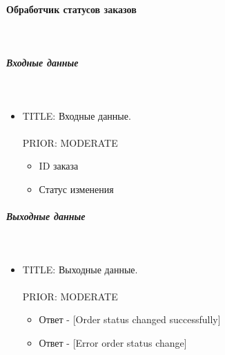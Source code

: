 \paragraph{Обработчик статусов заказов} \mbox{} \\ \label{service_order_status_processing}

	\subparagraph{Входные данные} \mbox{} \\ \label{}

      \begin{itemize}

        \item{

          TITLE: Входные данные.\\
          \\
          PRIOR: MODERATE\\

        }

        \begin{itemize}
          \item ID заказа
          \item Статус изменения
        \end{itemize}

      \end{itemize}

    \subparagraph{Выходные данные} \mbox{} \\

      \begin{itemize}

        \item{

          TITLE: Выходные данные.\\
          \\
          PRIOR: MODERATE\\

        }

        \begin{itemize}
          \item Ответ - [Order status changed successfully]
          \item Ответ - [Error order status change]
        \end{itemize}

      \end{itemize}

